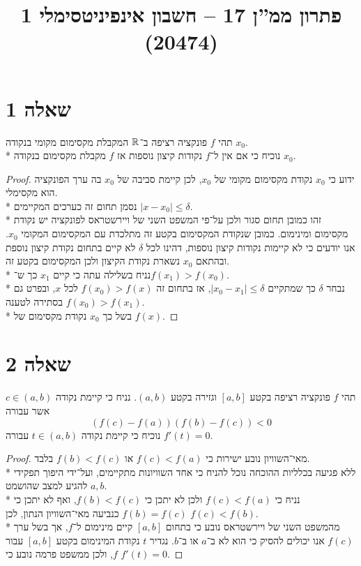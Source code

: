 
\title{פתרון ממ''ן 17 – חשבון אינפיניטסימלי 1 (20474)}


\maketitle
\section{שאלה 1}
תהי $f$ פונקציה רציפה ב־$\mathbb{R}$ המקבלת מקסימום מקומי בנקודה $x_0$. \\*
נוכיח כי אם אין ל־$f$ נקודות קיצון נוספות אז $f$ מקבלת מקסימום בנקודה $x_0$.
\begin{proof}
	ידוע כי $x_0$ נקודת מקסימום מקומי של $x_0$, לכן קיימת סביבה של $x_0$ בה ערך הפונקציה הוא מקסימלי. \\*
	נסמן תחום זה כערכים המקיימים $|x - x_0| \le \delta$. \\*
	זהו כמובן תחום סגור ולכן על־פי המשפט השני של ויירשטראס לפונקציה יש נקודת מקסימום ומינימום.
	כמובן שנקודת המקסימום בקטע זה מתלכדת עם המקסימום המקומי $x_0$.
	אנו יודעים כי לא קיימות נקודות קיצון נוספות, דהינו לכל $\delta$ לא קיים בתחום נקודת קיצון נוספת ובהתאם $x_0$ נשארת נקודת הקיצון ולכן המקסימום בקטע זה. \\*
	נניח בשלילה עתה כי קיים $x_1$ כך ש־$f(x_1) > f(x_0)$. \\*
	נבחר $\delta$ כך שמתקיים $|x_0 - x_1| \le \delta$, אז בתחום זה $f(x_0) > f(x)$ לכל $x$, ובפרט גם $f(x_0) > f(x_1)$ בסתירה לטענה. \\*
	בשל כך $x_0$ נקודת מקסימום של $f(x)$.
\end{proof}

\section{שאלה 2}
תהי $f$ פונקציה רציפה בקטע $[a, b]$ וגזירה בקטע $(a, b)$. נניח כי קיימת נקודה $c \in (a, b)$ אשר עבורה
\[
	(f(c) - f(a))(f(b) - f(c)) < 0
\]
נוכיח כי קיימת נקודה $t \in (a, b)$ עבורה $f'(t) = 0$.
\begin{proof}
	מאי־השוויון נובע ישירות כי $f(c) < f(a)$ או $f(b) < f(c)$ בלבד. \\*
	ללא פגיעה בכלליות ההוכחה נוכל להניח כי אחד השוויונות מתקיימים, ועל־ידי היפוך תפקידי $a, b$ להגיע למצב שהושמט. \\*
	נניח כי $f(c) < f(a)$ ולכן לא יתכן כי $f(b) < f(c)$, ואף לא יתכן כי $f(b) = f(c)$ כנביעה מאי־השוויון הנתון, לכן $f(c) < f(b)$. \\*
	מהמשפט השני של ויירשטראס נובע כי בתחום $[a, b]$ קיים מינימום ל־$f$, אך בשל ערך $f(c)$ אנו יכולים להסיק כי הוא לא ב־$a$ או ב־$b$.
	נגדיר $t$ נקודת המינימום בקטע $[a, b]$ עבור $f$, ולכן ממשפט פרמה נובע כי $f'(t) = 0$.
\end{proof}

